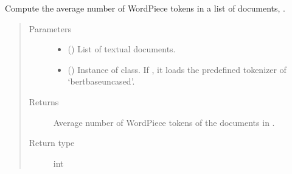 \documentclass[letterpaper,10pt,english]{sphinxmanual}
\begin{document}
\begin{fulllineitems}
\label{\detokenize{code:code_utils.utils.compute_avg_wordpiece_tokens}}
Compute the average number of WordPiece tokens in a list of documents, .
\begin{quote}\begin{description}
\item[{Parameters}] \leavevmode\begin{itemize}
\item {} 
 () \textendash{} List of textual documents.

\item {} 
 (\sphinxstyleliteralemphasis{\sphinxupquote{, }}) \textendash{} Instance of  class. If , it loads the
predefined tokenizer of ‘bert\sphinxhyphen{}base\sphinxhyphen{}uncased’.

\end{itemize}

\item[{Returns}] \leavevmode
Average number of WordPiece tokens of the documents in .

\item[{Return type}] \leavevmode
int

\end{description}\end{quote}

\end{fulllineitems}

\end{document}
